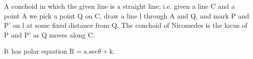 A conchoid in which the given line is a straight line; i.e. given a line C 
and a point A we pick a point Q on C, draw a line l through A and Q, and 
mark P and P' on l at some fixed distance from Q. The conchoid of Nicomedes is the
locus of P and P' as Q moves along C.
\par
It has polar equation $ \mathrm{R=a.sec} \theta + \mathrm{k}. $